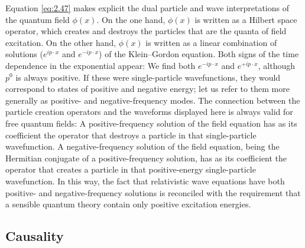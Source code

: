 Equation \eqref{eq:2.47} makes explicit the dual particle and wave
interpretations of the quantum field $\phi(x)$.  On the one hand,
$\phi(x)$ is written as a Hilbert space operator, which creates and
destroys the particles that are the quanta of field excitation.  On the
other hand, $\phi(x)$ is written as a linear combination of solutions
($e^{ip\cdot x}$ and $e^{-ip\cdot x}$) of the Klein--Gordon equation.
Both signs of the time dependence in the exponential appear: We find both
$e^{-ip\cdot x}$ and $e^{+ip\cdot x}$, although $p^0$ is always positive.
If these were single-particle wavefunctions, they would correspond to
states of positive and negative energy; let us refer to them more
generally as positive- and negative-frequency modes.  The connection
between the particle creation operators and the waveforms displayed here
is always valid for free quantum fields: A positive-frequency solution of
the field equation has as its coefficient the operator that destroys a
particle in that single-particle wavefunction.  A negative-frequency
solution of the field equation, being the Hermitian conjugate of a
positive-frequency solution, has as its coefficient the operator that
creates a particle in that positive-energy single-particle wavefunction.
In this way, the fact that relativistic wave equations have both
positive- and negative-frequency solutions is reconciled with the
requirement that a sensible quantum theory contain only positive
excitation energies.

\subsection{Causality}

